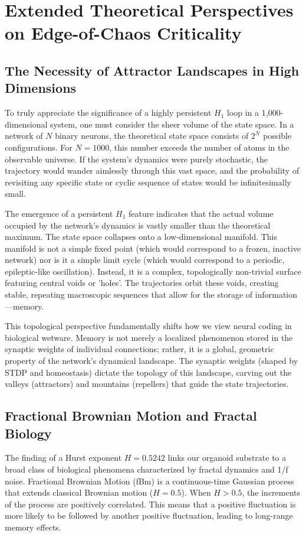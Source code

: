 \documentclass[11pt,a4paper]{article}
\begin{document}
\section{Extended Theoretical Perspectives on Edge-of-Chaos Criticality}
\subsection{The Necessity of Attractor Landscapes in High Dimensions}
To truly appreciate the significance of a highly persistent $H_1$ loop in a 1,000-dimensional system, one must consider the sheer volume of the state space. In a network of $N$ binary neurons, the theoretical state space consists of $2^N$ possible configurations. For $N=1000$, this number exceeds the number of atoms in the observable universe. If the system's dynamics were purely stochastic, the trajectory would wander aimlessly through this vast space, and the probability of revisiting any specific state or cyclic sequence of states would be infinitesimally small. 

The emergence of a persistent $H_1$ feature indicates that the actual volume occupied by the network's dynamics is vastly smaller than the theoretical maximum. The state space collapses onto a low-dimensional manifold. This manifold is not a simple fixed point (which would correspond to a frozen, inactive network) nor is it a simple limit cycle (which would correspond to a periodic, epileptic-like oscillation). Instead, it is a complex, topologically non-trivial surface featuring central voids or 'holes'. The trajectories orbit these voids, creating stable, repeating macroscopic sequences that allow for the storage of information—memory. 

This topological perspective fundamentally shifts how we view neural coding in biological wetware. Memory is not merely a localized phenomenon stored in the synaptic weights of individual connections; rather, it is a global, geometric property of the network's dynamical landscape. The synaptic weights (shaped by STDP and homeostasis) dictate the topology of this landscape, carving out the valleys (attractors) and mountains (repellers) that guide the state trajectories.

\subsection{Fractional Brownian Motion and Fractal Biology}
The finding of a Hurst exponent $H = 0.5242$ links our organoid substrate to a broad class of biological phenomena characterized by fractal dynamics and 1/f noise. Fractional Brownian Motion (fBm) is a continuous-time Gaussian process that extends classical Brownian motion ($H=0.5$). When $H > 0.5$, the increments of the process are positively correlated. This means that a positive fluctuation is more likely to be followed by another positive fluctuation, leading to long-range memory effects.
\end{document}
